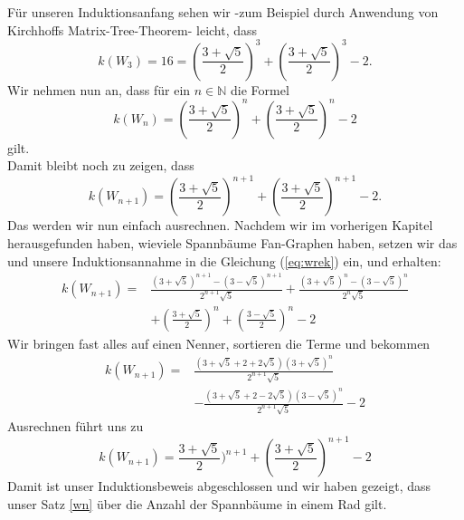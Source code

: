 Für unseren Induktionsanfang sehen wir -zum Beispiel durch Anwendung von Kirchhoffs Matrix-Tree-Theorem- leicht, dass \begin{equation}
\mathit{k}(W_3) = 16 = (\frac{3+\sqrt{5}}{2})^3+(\frac{3+\sqrt{5}}{2})^3-2.
\end{equation}
Wir nehmen nun an, dass für ein $n \in \mathbb{N}$ die Formel 
\begin{equation}
 \mathit{k}(W_n) = (\frac{3+\sqrt{5}}{2})^n+(\frac{3+\sqrt{5}}{2})^n-2
\end{equation}
gilt.\\
Damit bleibt noch zu zeigen, dass
\begin{equation}
 \mathit{k}(W_{n+1}) = (\frac{3+\sqrt{5}}{2})^{n+1}+(\frac{3+\sqrt{5}}{2})^{n+1}-2.
\end{equation}
Das werden wir nun einfach ausrechnen.
Nachdem wir im vorherigen Kapitel herausgefunden haben, wieviele Spannbäume Fan-Graphen haben, setzen wir das und unsere Induktionsannahme in die Gleichung (\ref{eq:wrek}) ein, und erhalten:\\
\begin{equation}
\begin{aligned}
\mathit{k}(W_{n+1}) ={} & \frac{(3+\sqrt{5})^{n+1}-(3-\sqrt{5})^{n+1}}{2^{n+1}\sqrt{5}} + \frac{(3+\sqrt{5})^{n}-(3-\sqrt{5})^{n}}{2^{n}\sqrt{5}}\\
& + (\frac{3+\sqrt{5}}{2})^n+(\frac{3-\sqrt{5}}{2})^n-2
\end{aligned}
\end{equation}
Wir bringen fast alles auf einen Nenner, sortieren die Terme und bekommen
\begin{equation}
\begin{aligned}
\mathit{k}(W_{n+1}) = {}  & \frac{(3+\sqrt{5}+2+2\sqrt{5})(3+\sqrt{5})^{n}}{2^{n+1}\sqrt{5}} \\%
                        & -\frac{(3+\sqrt{5}+2-2\sqrt{5})(3-\sqrt{5})^{n}}{2^{n+1}\sqrt{5}}-2 
\end{aligned}
\end{equation}
Ausrechnen führt uns zu\\
\begin{equation}
\mathit{k}(W_{n+1}) = \frac{3+\sqrt{5}}{2})^{n+1}+(\frac{3+\sqrt{5}}{2})^{n+1}-2
\end{equation}
Damit ist unser Induktionsbeweis abgeschlossen und wir haben gezeigt, dass unser Satz \ref{wn} über die Anzahl der Spannbäume in einem Rad gilt.

